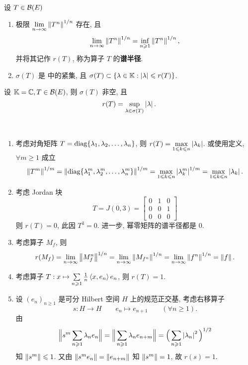 	\begin{Theorem}[谱半径]\label{thm:谱半径}
		设 $ T\in\mathcal{B}(E) $
		\begin{enumerate}[(1)]
			\item 极限 $ \lim\limits_{n\to\infty} \left\| T^{n} \right\|^{1/n} $ 存在, 且
			\[
				\lim_{n\to\infty}\left\| T^{n} \right\|^{1/n}=\inf_{n\geqslant1}\left\| T^{n} \right\|^{1/n},
			\]
			并将其记作 $ r(T) $, 称为算子 $ T $ 的\textbf{谱半径}. 
			\item $ \sigma(T) $ 是 \K 中的紧集, 且 $ \sigma(T)\subset\{ \lambda\in\mathbb{K}:\left| \lambda \right| \leqslant r(T) \} $. 
		\end{enumerate}
	\end{Theorem}

	\begin{Theorem}[谱半径定理]\label{thm:谱半径定理}
		设 $ \mathbb{K}=\mathbb{C}, T\in\mathcal{B}(E) $, 则 $ \sigma(T) $ 非空, 且
		\[
			r(T)=\sup_{\lambda\in\sigma(T)}\left| \lambda \right| .
		\]
	\end{Theorem}

	\begin{Example}
		~
		\begin{enumerate}[(1)]
			\item 考虑对角矩阵 $ T=\operatorname{diag}\{ \lambda_{1}, \lambda_{2}, \dots, \lambda_{n} \} $, 则 $ r(T)=\max\limits_{1\leqslant k\leqslant n}\left| \lambda_{k} \right|  $. 或使用定义, $ \forall m\geqslant1 $ 成立
			\[
				\left\| T^{m} \right\|^{1/m}=\left\| \operatorname{diag}\{ \lambda^{m}_{1}, \lambda^{m}_{2}, \dots, \lambda^{m}_{n} \} \right\|^{1/m}=\max_{1\leqslant k\leqslant n}\left| \lambda_{k}^{m} \right| ^{1/m}=\max_{1\leqslant k\leqslant n}\left| \lambda_{k} \right| .
			\]
			\item 考虑 Jordan 块
			\[
				T = J(0, 3)=\begin{bmatrix}
					0 & 1 & 0\\
					0 & 0 & 1\\
					0 & 0 & 0
				\end{bmatrix}
			\]
			则 $ r(T)=0 $, 此因 $ T^{3}=0 $. 进一步, 幂零矩阵的谱半径都是 0.
			\item 考虑算子 $ M_{f} $, 则
			\[
				r(M_{f}) = \lim_{n\to\infty}\left\| M_{f}^{n} \right\|^{1/n}=\lim_{n\to\infty}\left\| M_{f^{n}} \right\|^{1/n}=\lim_{n\to\infty}\left\| f^{n} \right\|^{1/n}=\left\| f \right\|.
			\]
			\item 考虑算子 $ T: x\mapsto\sum\limits_{n\geqslant1}\frac{1}{n}\left\langle x, e_{n} \right\rangle e_{n} $, 则 $ r(T)=1 $.
			\item 设 $ (e_{n})_{n\geqslant1} $ 是可分 Hilbert 空间 $ H $ 上的规范正交基, 考虑右移算子
			\[
				s: H\to H\qquad e_{n}\mapsto e_{n+1}\qquad (\forall n\geqslant1).
			\]
			由
			\[
				\Big\| s^{m}\sum_{n\geqslant1}\lambda_{n}e_{n} \Big\|=\Big\| \sum_{n\geqslant1}\lambda_{n}e_{n+m} \Big\|=\Big( \sum_{n\geqslant1}\left| \lambda_{n} \right| ^{2} \Big)^{1/2}
			\]
			知 $ \left\| s^{m} \right\|\leqslant1 $. 又由 $ \left\| s^{m}e_{n} \right\|=\left\| e_{n+m} \right\| $ 知 $ \left\| s^{m} \right\|=1 $, 故 $ r(s)=1 $. 
		\end{enumerate}
	\end{Example}

